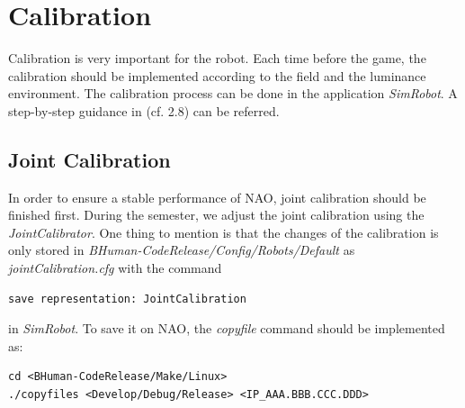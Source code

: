 \section{Calibration}
Calibration is very important for the robot. Each time before the game, the calibration should be implemented according to the field and the luminance environment. The calibration process can be done in the application \textit{SimRobot}. A step-by-step guidance in \cite{BHumanCodeRelease2015}(cf. 2.8) can be referred.
\subsection{Joint Calibration}
In order to ensure a stable performance of NAO, joint calibration should be finished first. During the semester, we adjust the joint calibration using the \textit{JointCalibrator}. One thing to mention is that the changes of the calibration is only stored in \textit{BHuman-CodeRelease/Config/Robots/Default} as \textit{jointCalibration.cfg} with the command
\begin{lstlisting}
save representation: JointCalibration
\end{lstlisting}
in \textit{SimRobot}. To save it on NAO, the \textit{copyfile} command should be implemented as:
\begin{lstlisting}
cd <BHuman-CodeRelease/Make/Linux>
./copyfiles <Develop/Debug/Release> <IP_AAA.BBB.CCC.DDD>
\end{lstlisting}
